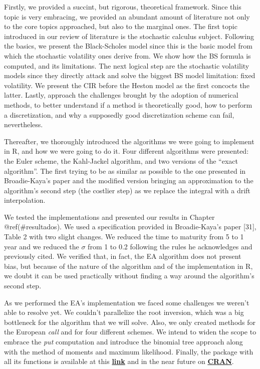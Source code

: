 \documentclass[12pt,twoside]{reedthesis}
\theoremstyle{definition}
\theoremstyle{definition}
\theoremstyle{remark}
\begin{document}
  Firstly, we provided a succint, but rigorous, theoretical framework.
  Since this topic is very embracing, we provided an abundant amount of
  literature not only to the core topics approached, but also to the
  marginal ones. The first topic introduced in our review of literature is
  the stochastic calculus subject. Following the basics, we present the
  Black-Scholes model since this is the basic model from which the
  stochastic volatility ones derive from. We show how the BS formula is
  computed, and its limitations. The next logical step are the stochastic
  volatility models since they directly attack and solve the biggest BS
  model limitation: fixed volatility. We present the CIR before the Heston
  model as the first concocts the latter. Lastly, approach the challenges
  brought by the adoption of numerical methods, to better understand if a
  method is theoretically good, how to perform a discretization, and why a
  supposedly good discretization scheme can fail, nevertheless.
  
  Thereafter, we thoroughly introduced the algorithms we were going to
  implement in R, and how we were going to do it. Four different
  algorithms were presented: the Euler scheme, the Kahl-Jackel algorithm,
  and two versions of the ``exact algorithm''. The first trying to be as
  similar as possible to the one presented in Broadie-Kaya's paper and the
  modified version bringing an approximation to the algorithm's second
  step (the costlier step) as we replace the integral with a drift
  interpolation.
  
  We tested the implementations and presented our results in Chapter
  @ref(\#resultados). We used a specification provided in Broadie-Kaya's
  paper {[}31{]}, Table 2 with two slight changes. We reduced the time to
  maturity from 5 to 1 year and we reduced the \(\sigma\) from 1 to 0.2
  following the rules he acknowledges and previously cited. We verified
  that, in fact, the EA algorithm does not present bias, but because of
  the nature of the algorithm and of the implementation in R, we doubt it
  can be used practically without finding a way around the algorithm's
  second step.
  
  As we performed the EA's implementation we faced some challenges we
  weren't able to resolve yet. We couldn't parallelize the root inversion,
  which was a big bottleneck for the algorithm that we will solve. Also,
  we only created methods for the European \emph{call} and for four
  different schemes. We intend to widen the scope to embrace the
  \emph{put} computation and introduce the binomial tree approach along
  with the method of moments and maximum likelihood. Finally, the package
  with all its functions is available at this
  \href{<https://github.com/fernote7/rnmethods>}{\textbf{link}} and in the
  near future on \href{<https://cran.r-project.org/>}{\textbf{CRAN}}.
  
\end{document}
